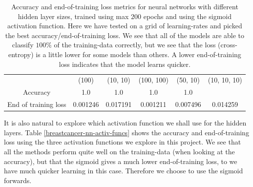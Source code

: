 \documentclass{article}
\begin{document}
\begin{table}
      \centering
      \begin{tabular}{| c | c | c | c | c | c |}
                                 & (100)    & (10, 10) & (100, 100) & (50, 10) & (10, 10, 10) \\
            Accuracy             & 1.0      & 1.0      & 1.0        & 1.0                     \\
            End of training loss & 0.001246 & 0.017191 & 0.001211   & 0.007496 & 0.014259     \\
      \end{tabular}
      \caption{Accuracy and end-of-training loss metrics for neural networks
            with different hidden layer sizes, trained using max $200$ epochs and
            using the sigmoid activation function. Here we have tested on a grid of
            learning-rates and picked the best accuracy/end-of-training loss. We see
            that all of the models are able to classify $100\%$ of the training-data
            correctly, but we see that the loss (cross-entropy) is a little lower for
            some models than others. A lower end-of-training loss indicates that the
            model learns quicker.}
      \label{breastcancer-nn-hidden-layers}
\end{table}

It is also natural to explore which activation function we shall use for the
hidden layers. Table \ref{breastcancer-nn-activ-funcs} shows the accuracy and
end-of-training loss using the three activation functions we explore in this
project. We see that all the methods perform quite well on the training-data
(when looking at the accuracy), but that the sigmoid gives a much lower
end-of-training loss, to we have much quicker learning in this case. Therefore
we choose to use the sigmoid forwards.
\end{document}
